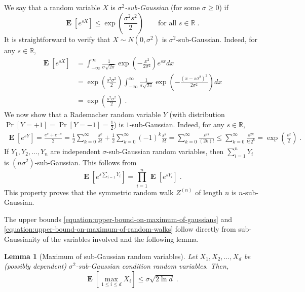 \documentclass{article}
\DeclareMathOperator*{\Exp}{\mathbf{E}}
\newcommand{\field}[1]{\mathbb{#1}}
\newcommand{\R}{\field{R}}
\newtheorem{lemma}[theorem]{Lemma}
\begin{document}
We say that a random variable $X$ is \emph{$\sigma^2$-sub-Gaussian} (for some $\sigma \ge 0$) if
\begin{equation}
\label{equation:sigma-sub-gaussian}
\Exp \left[ e^{sX} \right] \le \exp\left( \frac{\sigma^2 s^2}{2} \right) \qquad \text{for all $s \in \R$} \; .
\end{equation}
It is straightforward to verify that $X \sim N(0,\sigma^2)$ is $\sigma^2$-sub-Gaussian. Indeed, for any $s \in \R$,
\begin{align*}
\Exp \left[ e^{sX} \right]
& = \int_{-\infty}^\infty \frac{1}{\sigma \sqrt{2\pi}} \exp\left( - \frac{x^2}{2\sigma^2} \right) e^{sx} dx \\
& = \exp\left( \frac{s^2\sigma^2}{2} \right) \int_{-\infty}^\infty \frac{1}{\sigma \sqrt{2\pi}} \exp\left( - \frac{(x - s\sigma^2)^2}{2\sigma^2} \right) dx \\
& = \exp\left( \frac{s^2\sigma^2}{2} \right) \; .
\end{align*}
We now show that a Rademacher random variable $Y$ (with distribution $\Pr[Y = +1] = \Pr[Y=-1] = \frac{1}{2}$)
is $1$-sub-Gaussian. Indeed, for any $s \in \R$,
\begin{align*}
\Exp \left[ e^{sY} \right]
= \frac{e^{s} + e^{-s}}{2}
= \frac{1}{2}\sum_{k=0}^\infty \frac{s^k}{k!}
+ \frac{1}{2}\sum_{k=0}^\infty (-1)^k \frac{s^k}{k!}
= \sum_{k=0}^\infty \frac{s^{2k}}{(2k)!}
\le \sum_{k=0}^\infty \frac{s^{2k}}{k! 2^k}
= \exp\left( \frac{s^2}{2} \right) \; .
\end{align*}
If $Y_1, Y_2, \dots, Y_n$ are independent $\sigma$-sub-Gaussian random variables, then $\sum_{i=1}^n Y_i$ is $(n\sigma^2)$-sub-Gaussian.
This follows from
$$
\Exp \left[ e^{s \sum_{i=1} Y_i} \right] = \prod_{i=1}^n \Exp \left[ e^{sY_i} \right] \; .
$$
This property proves that the symmetric random walk $Z^{(n)}$ of length $n$ is $n$-sub-Gaussian.

The upper bounds \eqref{equation:upper-bound-on-maximum-of-gaussians} and
\eqref{equation:upper-bound-on-maximum-of-random-walks} follow directly from
sub-Gaussianity of the variables involved and the following lemma.

\begin{lemma}[Maximum of sub-Gaussian random variables]
Let $X_1, X_2, \dots, X_d$ be (possibly dependent) $\sigma^2$-sub-Gaussian condition random variables.
Then,
$$
\Exp\left[ \max_{1 \le i \le d} X_i \right] \le \sigma \sqrt{2 \ln d} \; .
$$
\end{lemma}
\end{document}
